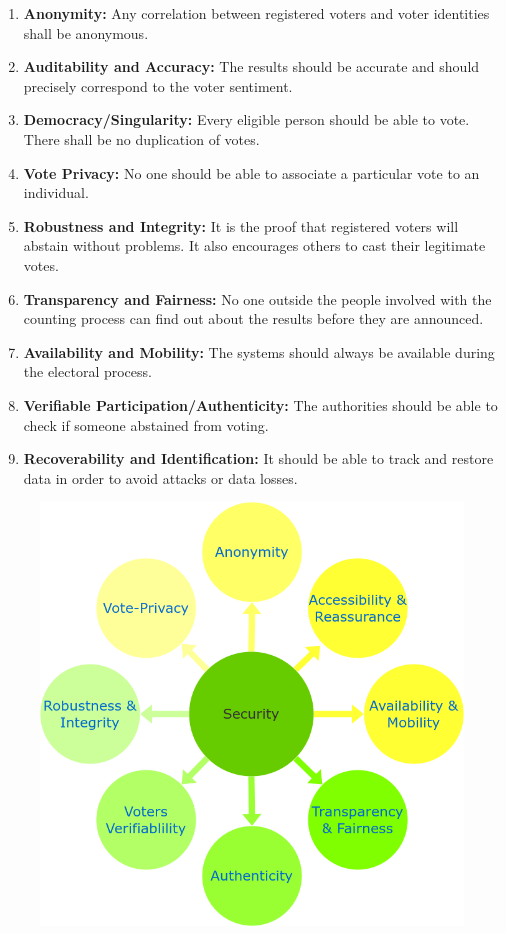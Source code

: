 \documentclass[oneside, 12pt]{book}
\begin{document}
\begin{enumerate}
	      \begin{enumerate}[i]
		      \item\textbf{Anonymity:} Any correlation between registered voters and voter identities shall be anonymous.
		      \item\textbf{Auditability and Accuracy:} The results should be accurate and should precisely correspond to the voter sentiment.
		      \item\textbf{Democracy/Singularity:} Every eligible person should be able to vote. There shall be no duplication of votes.
		      \item\textbf{Vote Privacy:} No one should be able to associate a particular vote to an individual.
		      \item\textbf{Robustness and Integrity:} It is the proof that registered voters will abstain without problems. It also encourages others to cast their legitimate votes.
		      \item\textbf{Transparency and Fairness:} No one outside the people involved with the counting process can find out about the results before they are announced.
		      \item\textbf{Availability and Mobility:} The systems should always be available during the electoral process.
		      \item\textbf{Verifiable Participation/Authenticity:} The authorities should be able to check if someone abstained from voting.
		      \item\textbf{Recoverability and Identification:} It should be able to track and restore data in order to avoid attacks or data losses.
	      \end{enumerate}
	      \begin{figure}[H]
		      \centering
		      \includegraphics[width=0.6\linewidth]{./Resources/security-requirements.png}

\end{figure}
\end{enumerate}
\end{document}
